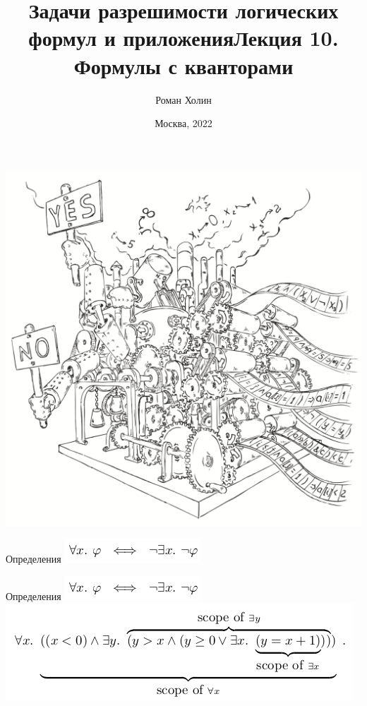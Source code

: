 \documentclass{beamer}
\begin{document}
\title{Задачи разрешимости логических формул и приложения\newline Лекция 10. Формулы с кванторами}
\author{Роман Холин}
\date{Москва, 2022}

\begin{frame}
\includegraphics[scale=0.5]{../decision-procedure.png}
\end{frame}

\frame{\titlepage}

\begin{frame}{Определения}
\includegraphics[scale=0.5]{all_and_exist.png}\newline
\end{frame}

\begin{frame}{Определения}
\includegraphics[scale=0.5]{all_and_exist.png}\newline
\includegraphics[scale=0.5]{scope.png}\newline
\end{frame}
\end{document}
